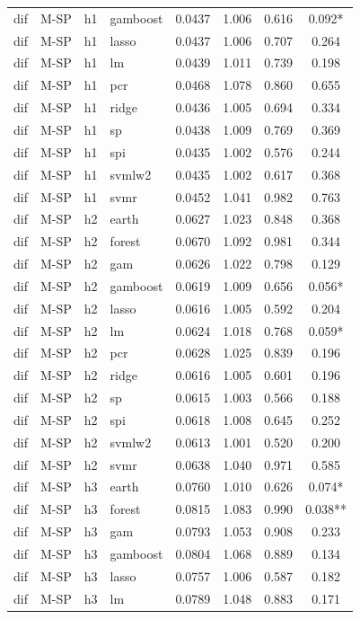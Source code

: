 \begin{ThreePartTable}
\begin{longtable}[t]{llclcccc}
dif & M-SP & h1 & gamboost & 0.0437 & 1.006 & 0.616 & 0.092*\\
dif & M-SP & h1 & lasso & 0.0437 & 1.006 & 0.707 & 0.264\\
dif & M-SP & h1 & lm & 0.0439 & 1.011 & 0.739 & 0.198\\
dif & M-SP & h1 & pcr & 0.0468 & 1.078 & 0.860 & 0.655\\
dif & M-SP & h1 & ridge & 0.0436 & 1.005 & 0.694 & 0.334\\
dif & M-SP & h1 & sp & 0.0438 & 1.009 & 0.769 & 0.369\\
dif & M-SP & h1 & spi & 0.0435 & 1.002 & 0.576 & 0.244\\
dif & M-SP & h1 & svmlw2 & 0.0435 & 1.002 & 0.617 & 0.368\\
dif & M-SP & h1 & svmr & 0.0452 & 1.041 & 0.982 & 0.763\\
\addlinespace
dif & M-SP & h2 & earth & 0.0627 & 1.023 & 0.848 & 0.368\\
dif & M-SP & h2 & forest & 0.0670 & 1.092 & 0.981 & 0.344\\
dif & M-SP & h2 & gam & 0.0626 & 1.022 & 0.798 & 0.129\\
dif & M-SP & h2 & gamboost & 0.0619 & 1.009 & 0.656 & 0.056*\\
dif & M-SP & h2 & lasso & 0.0616 & 1.005 & 0.592 & 0.204\\
dif & M-SP & h2 & lm & 0.0624 & 1.018 & 0.768 & 0.059*\\
dif & M-SP & h2 & pcr & 0.0628 & 1.025 & 0.839 & 0.196\\
dif & M-SP & h2 & ridge & 0.0616 & 1.005 & 0.601 & 0.196\\
dif & M-SP & h2 & sp & 0.0615 & 1.003 & 0.566 & 0.188\\
dif & M-SP & h2 & spi & 0.0618 & 1.008 & 0.645 & 0.252\\
dif & M-SP & h2 & svmlw2 & 0.0613 & 1.001 & 0.520 & 0.200\\
dif & M-SP & h2 & svmr & 0.0638 & 1.040 & 0.971 & 0.585\\
\addlinespace
dif & M-SP & h3 & earth & 0.0760 & 1.010 & 0.626 & 0.074*\\
dif & M-SP & h3 & forest & 0.0815 & 1.083 & 0.990 & 0.038**\\
dif & M-SP & h3 & gam & 0.0793 & 1.053 & 0.908 & 0.233\\
dif & M-SP & h3 & gamboost & 0.0804 & 1.068 & 0.889 & 0.134\\
dif & M-SP & h3 & lasso & 0.0757 & 1.006 & 0.587 & 0.182\\
dif & M-SP & h3 & lm & 0.0789 & 1.048 & 0.883 & 0.171\\

\end{longtable}
\end{ThreePartTable}
